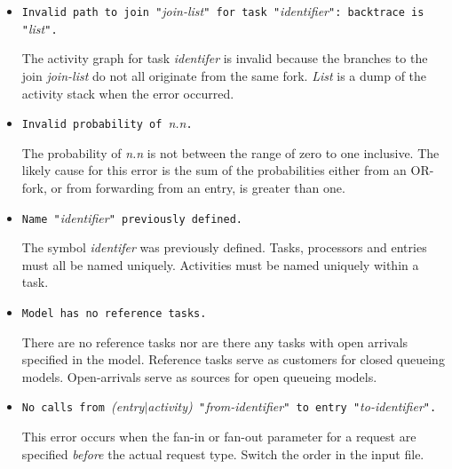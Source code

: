 \begin{itemize}
\item \texttt{Invalid path to join "}\emph{join-list}\texttt{" for
    task "}\emph{identifier}\texttt{": backtrace is
    "}\emph{list}\texttt{".}
  
  The activity graph for task
  \emph{identifer} is invalid because the branches to the
  join \emph{join-list} do not all originate from the
  same fork.  \emph{List} is a dump of the activity
  stack when the error occurred.

\item \texttt{Invalid probability of }\emph{n.n}\texttt{.}
  
  The probability of \emph{n.n} is not between
  the range of zero to one inclusive.  The likely cause for this error
  is the sum of the
  probabilities
  either from an OR-fork, or from
  forwarding from an entry, is greater than one.

\item \texttt{Name "}\emph{identifier}\texttt{" previously defined.}
  
  The symbol
  \emph{identifer}
  was previously defined.  Tasks, processors and entries must all be
  named uniquely.  Activities must be named uniquely within a task.

\item \texttt{Model has no reference tasks.}
  
  There are no reference tasks nor are there
  any tasks with open arrivals specified in
  the model.  Reference tasks serve as customers for closed queueing
  models.
  Open-arrivals serve as sources for open queueing
  models.

\item \texttt{No calls from }\emph{(entry$|$activity)}\texttt{
    "}\emph{from-identifier}\texttt{" to entry
    "}\emph{to-identifier}\texttt{".}
  
  This error occurs when the fan-in or
  fan-out parameter for a request are specified
  \emph{before} the actual request type.  Switch the order in the
  input file.


\end{itemize}
